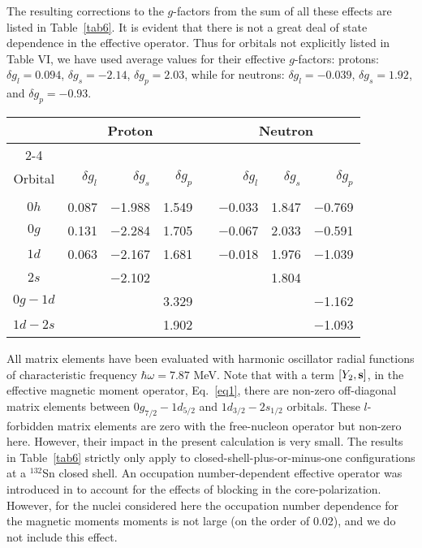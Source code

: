 \documentclass[aps,twocolumn,superscriptaddress,prc,showpacs]{revtex4}
\begin{document}
The resulting corrections to the $  g  $-factors from the sum of all
these effects are listed in Table~\ref{tab6}. 
It is evident that there is not a great 
deal of state dependence in the effective operator.  Thus for orbitals not 
explicitly listed in Table VI, we have used average values for their 
effective $g$-factors:  protons: $\delta g_l=0.094$, 
$\delta g_s=-2.14$, $\delta g_p=2.03$, while for neutrons:
$\delta g_l=-0.039$, $\delta g_s=1.92$, and $\delta g_p =-0.93$.
\begingroup
\begin{table*}
 \caption{\label{tab6}Effective $  g  $-factors from core-polarization and MEC calculations.}
\begin{ruledtabular}
\begin{tabular}{crrrcrrr}
 & \multicolumn{3}{c}{Proton} & & \multicolumn{3}{c}{Neutron} \\
\cline{2-4}
\cline{6-8}
 & & & & & & & \\ [-3mm]
Orbital & $  \delta g_{l}   $ & $  \delta g_{s}   $ & $  \delta g_{p}
$ & &
$  \delta g_{l}   $ & $  \delta g_{s}   $  & $  \delta g_{p}   $ \\
\hline \\ [-3mm]
   $  0h  $  &    0.087 & $-$1.988 &    1.549 & &
            $-$0.033  &  1.847 & $-$0.769 \\
  $  0g  $  &   0.131 & $-$2.284  &  1.705 & &
            $-$0.067 &   2.033 & $-$0.591  \\
  $  1d  $  &   0.063 & $-$2.167 &   1.681  & &
            $-$0.018  &  1.976 &  $-$1.039  \\
  $  2s  $  &  &         $-$2.102  & & &
                &  1.804  & \\
 $  0g-1d  $  & & &                   3.329 & &
          & &            $-$1.162 \\
 $  1d-2s  $  & & &                   1.902 & &
          & &            $-$1.093 \\
\end{tabular}
\end{ruledtabular}
\end{table*}
\endgroup
All matrix elements have
been evaluated with harmonic oscillator radial functions of
characteristic frequency $  \hbar \omega = 7.87  $ MeV.  Note that with
a term $  [Y_{2}, {\bf s}]  $, in the effective magnetic moment
operator,
Eq.~\ref{eq1}, there are non-zero off-diagonal matrix elements
between $  0g_{7/2}-1d_{5/2}  $
and $  1d_{3/2}-2s_{1/2}  $ orbitals.  These $  l  $-forbidden matrix
elements
are zero with the free-nucleon
operator but non-zero here.  However, their impact in the present
calculation is very small.
The results in Table~\ref{tab6} strictly only apply to
closed-shell-plus-or-minus-one configurations at a $^{132}$Sn closed
shell. An occupation number-dependent effective operator was
introduced in \cite{white} to account for the effects of blocking in the
core-polarization.  However, for the nuclei considered here
the occupation number dependence for the magnetic moments
moments is not large (on the order of 0.02), and we do not
include this effect.
\end{document}
